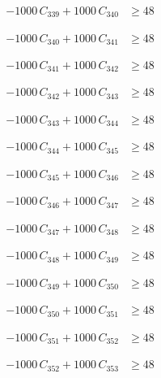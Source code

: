 \documentclass[a4paper,11pt]{article}
\begin{document}
\begin{align}
-1000\,C_{339} + 1000\,C_{340} &\geq 48 \nonumber
\end{align}

\begin{align}
-1000\,C_{340} + 1000\,C_{341} &\geq 48 \nonumber
\end{align}

\begin{align}
-1000\,C_{341} + 1000\,C_{342} &\geq 48 \nonumber
\end{align}

\begin{align}
-1000\,C_{342} + 1000\,C_{343} &\geq 48 \nonumber
\end{align}

\begin{align}
-1000\,C_{343} + 1000\,C_{344} &\geq 48 \nonumber
\end{align}

\begin{align}
-1000\,C_{344} + 1000\,C_{345} &\geq 48 \nonumber
\end{align}

\begin{align}
-1000\,C_{345} + 1000\,C_{346} &\geq 48 \nonumber
\end{align}

\begin{align}
-1000\,C_{346} + 1000\,C_{347} &\geq 48 \nonumber
\end{align}

\begin{align}
-1000\,C_{347} + 1000\,C_{348} &\geq 48 \nonumber
\end{align}

\begin{align}
-1000\,C_{348} + 1000\,C_{349} &\geq 48 \nonumber
\end{align}

\begin{align}
-1000\,C_{349} + 1000\,C_{350} &\geq 48 \nonumber
\end{align}

\begin{align}
-1000\,C_{350} + 1000\,C_{351} &\geq 48 \nonumber
\end{align}

\begin{align}
-1000\,C_{351} + 1000\,C_{352} &\geq 48 \nonumber
\end{align}

\begin{align}
-1000\,C_{352} + 1000\,C_{353} &\geq 48 \nonumber
\end{align}
\end{document}
